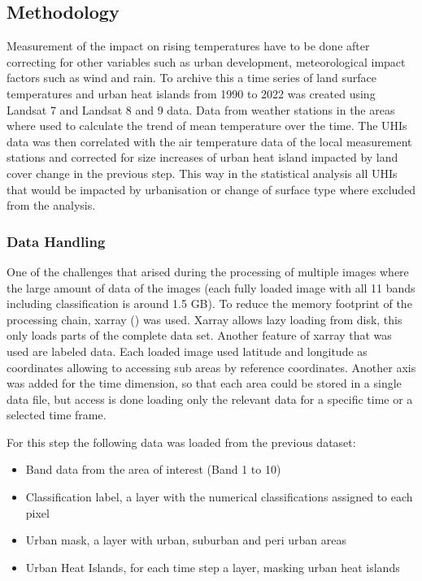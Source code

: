 \documentclass[12pt,a4paper, english]{article}
\begin{document}
    \subsection{Methodology}
    Measurement of the impact on rising temperatures have to be done after correcting for other variables such as urban development, meteorological impact factors such as wind and rain. 
    To archive this a time series of land surface temperatures and urban heat islands from 1990 to 2022 was created using Landsat 7 and Landsat 8 and 9 data.
    Data from weather stations in the areas where used to calculate the trend of mean temperature over the time. 
    The \glspl{UHI} data was then correlated with the air temperature data of the local measurement stations and corrected for size increases of urban heat island impacted by land cover change in the previous step. 
    This way in the statistical analysis all \glspl{UHI} that would be impacted by urbanisation or change of surface type where excluded from the analysis.
%
    \subsubsection{Data Handling}
    One of the challenges that arised during the processing of multiple images where the large amount of data of the images (each fully loaded image with all 11 bands including classification is around 1.5 GB).
    To reduce the memory footprint of the processing chain, xarray (\cite{hoyer2017xarray}) was used. 
    Xarray allows lazy loading from disk, this only loads parts of the complete data set. 
    Another feature of xarray that was used are labeled data. Each loaded image used latitude and longitude as coordinates allowing to accessing sub areas by reference coordinates. 
    Another axis was added for the time dimension, so that each area could be stored in a single data file, but access is done loading only the relevant data for a specific time or a selected time frame.

    For this step the following data was loaded from the previous dataset: 
    \begin{itemize}
      \item Band data from the area of interest (Band 1 to 10)
      \item Classification label, a layer with the numerical classifications assigned to each pixel 
      \item Urban mask, a layer with urban, suburban and peri urban areas
      \item Urban Heat Islands, for each time step a layer, masking urban heat islands
    \end{itemize}
\end{document}
